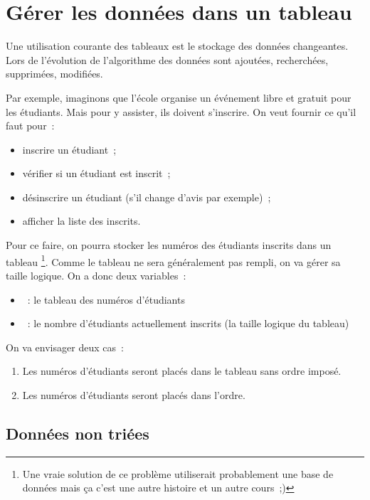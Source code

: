 \chapter{Gérer les données dans un tableau}

	Une utilisation courante des tableaux
	est le stockage des données changeantes.
	Lors de l’évolution de l’algorithme
	des données sont ajoutées, recherchées, supprimées, modifiées.
	
	Par exemple, imaginons que l’école 
	organise un événement libre et gratuit pour les étudiants.
	Mais pour y assister, ils doivent s’inscrire.
	On veut fournir ce qu’il faut pour~:
	\begin{itemize}
	\item inscrire un étudiant~;
	\item vérifier si un étudiant est inscrit~;
	\item désinscrire un étudiant (s’il change d’avis par exemple)~;
	\item afficher la liste des inscrits.
	\end{itemize}

	Pour ce faire,
	on pourra stocker les numéros des étudiants inscrits
	dans un tableau%
	\footnote{%
		Une vraie solution de ce problème
		utiliserait probablement une base de données
		mais ça c’est une autre histoire et un autre cours~;)
	}.
	Comme le tableau ne sera généralement pas rempli,
	on va gérer sa taille logique.
	On a donc deux variables~:
	\begin{itemize}
	\item {}~: le tableau des numéros d’étudiants
	\item {}~: le nombre d’étudiants actuellement inscrits (la taille logique du tableau)
	\end{itemize}
	
	On va envisager deux cas~:
	\begin{enumerate}
	\item
		Les numéros d’étudiants seront placés dans le tableau sans ordre imposé.
	\item
		Les numéros d’étudiants seront placés dans l’ordre.		
	\end{enumerate}
	
	\section{Données non triées} 
		
